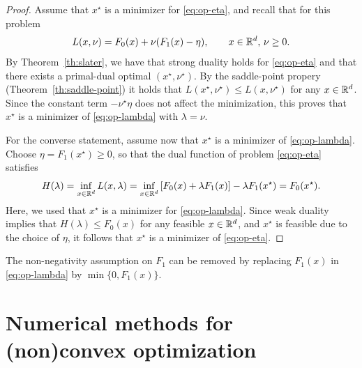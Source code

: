\documentclass{report}
\begin{document}
\begin{proof}
	Assume that $x^\star$ is a minimizer for \eqref{eq:op-eta}, and recall that for this problem 
	\begin{equation}
		L(x,\nu) = F_0(x) +\nu (F_1(x)-\eta), \qquad x\in \mathbb{R}^d,\, \nu\ge 0.
	\end{equation}
	By Theorem~\ref{th:slater}, we have that strong duality holds for \eqref{eq:op-eta} and that there exists a primal-dual optimal $(x^\star,\nu^\star)$. By the saddle-point propery (Theorem~\ref{th:saddle-point}) it holds that $L(x^\star, \nu^\star)\le L(x, \nu^\star)$ for any $x \in\mathbb{R}^d$. Since the constant term $-\nu^\star\eta$ does not affect the minimization, this proves that $x^\star$ is a minimizer of \eqref{eq:op-lambda} with $\lambda=\nu$.

	For the converse statement, assume now that $x^\star$ is a minimizer of \eqref{eq:op-lambda}. 
	Choose $\eta = F_1(x^\star)\ge 0$, so that the dual function of problem \eqref{eq:op-eta} satisfies
	\begin{equation}
		H(\lambda) = \inf_{x\in \mathbb{R}^d} L(x, \lambda) = \inf_{x\in \mathbb{R}^d} \left[ F_0(x) +\lambda F_1(x) \right] - \lambda F_1(x^\star) 
		= F_0(x^\star).
	\end{equation}
	Here, we used that $x^\star$ is a minimizer for \eqref{eq:op-lambda}.
	Since weak duality implies that $H(\lambda)\le F_0(x)$ for any feasible $x\in \mathbb{R}^d$, and $x^\star$ is feasible due to the choice of $\eta$, it follows that $x^\star$ is a minimizer of \eqref{eq:op-eta}.
\end{proof}

\begin{remark}
	The non-negativity assumption on $F_1$ can be removed by replacing $F_1(x)$ in \eqref{eq:op-lambda} by $\min\{0,F_1(x)\}$.
\end{remark}



	
\chapter{Numerical methods for (non)convex optimization}
\end{document}
